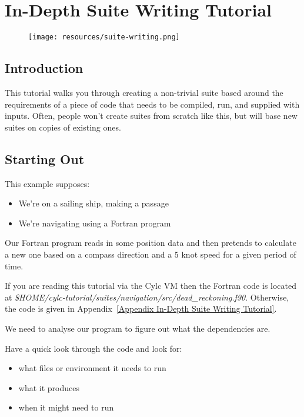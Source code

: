 \section{In-Depth Suite Writing Tutorial}
\label{In-Depth Suite Writing Tutorial}

\begin{figure}[htp]
\texttt{[image: resources/suite-writing.png]}
\end{figure}

\subsection{Introduction}

This tutorial walks you through creating a non-trivial suite based around the requirements of a piece of code that needs to be compiled, run, and supplied with inputs. Often, people won't create suites from scratch like this, but will base new suites on copies of existing ones.

\subsection{Starting Out}

This example supposes:
\begin{itemize}
    \item We're on a sailing ship, making a passage
    \item We're navigating using a Fortran program
\end{itemize}

Our Fortran program reads in some position data and then pretends to calculate a new one based on a compass direction and a 5 knot speed for a given period of time.

If you are reading this tutorial via the Cylc VM then the Fortran code is located at {\em \$HOME/cylc-tutorial/suites/navigation/src/dead\_reckoning.f90}. Otherwise, the code is given in Appendix~\ref{Appendix In-Depth Suite Writing Tutorial}.

We need to analyse our program to figure out what the dependencies are.

Have a quick look through the code and look for:
\begin{itemize}
    \item what files or environment it needs to run
    \item what it produces
    \item when it might need to run
\end{itemize}

